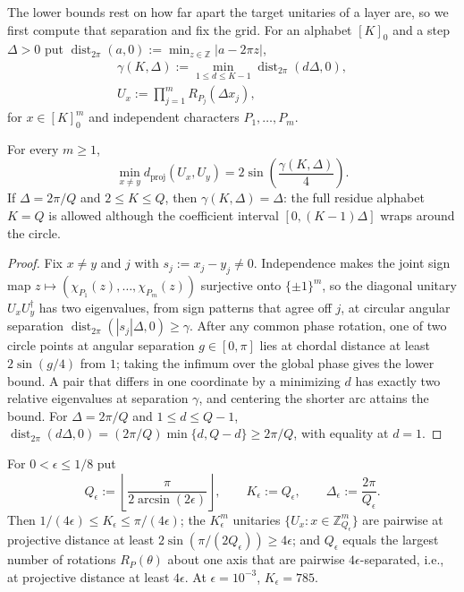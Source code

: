 The lower bounds rest on how far apart the target unitaries of a layer
are, so we first compute that separation and fix the grid.  For an
alphabet $[K]_0$ and a step $\Delta>0$ put
$\operatorname{dist}_{2\pi}(a,0):=\min_{z\in\mathbb Z}|a-2\pi z|$,
\begin{gather*}
 \gamma(K,\Delta):=\min_{1\leq d\leq K-1}
       \operatorname{dist}_{2\pi}(d\Delta,0),\\
 U_x:=\prod_{j=1}^mR_{P_j}(\Delta x_j),
\end{gather*}
for $x\in[K]_0^m$ and independent characters $P_1,\ldots,P_m$.

\begin{theorem}
\label{thm:w1-exact-separation}
For every $m\geq1$,
\begin{equation}
 \min_{x\neq y}d_{\mathrm{proj}}(U_x,U_y)
 =2\sin\!\left(\frac{\gamma(K,\Delta)}4\right).
 \label{eq:w1-exact-separation}
\end{equation}
If $\Delta=2\pi/Q$ and $2\leq K\leq Q$, then $\gamma(K,\Delta)=\Delta$:
the full residue alphabet $K=Q$ is allowed although the coefficient
interval $[0,(K-1)\Delta]$ wraps around the circle.
\end{theorem}

\begin{proof}
Fix $x\neq y$ and $j$ with $s_j:=x_j-y_j\neq0$.  Independence makes the
joint sign map $z\mapsto(\chi_{P_1}(z),\ldots,\chi_{P_m}(z))$ surjective
onto $\{\pm1\}^m$, so the diagonal unitary $U_xU_y^\dagger$ has two
eigenvalues, from sign patterns that agree off $j$, at circular angular
separation $\operatorname{dist}_{2\pi}(|s_j|\Delta,0)\geq\gamma$.  After
any common phase rotation, one of two circle points at angular separation
$g\in[0,\pi]$ lies at chordal distance at least $2\sin(g/4)$ from $1$;
taking the infimum over the global phase gives the lower bound.  A pair
that differs in one coordinate by a minimizing $d$ has exactly two
relative eigenvalues at separation $\gamma$, and centering the shorter arc
attains the bound.  For $\Delta=2\pi/Q$ and $1\leq d\leq Q-1$,
$\operatorname{dist}_{2\pi}(d\Delta,0)=(2\pi/Q)\min\{d,Q-d\}\geq2\pi/Q$,
with equality at $d=1$.
\end{proof}

\begin{corollary}
\label{cor:w1-epsilon-cyclic}
\label{lem:grid-calibration}
For $0<\epsilon\leq1/8$ put
\begin{equation}
 Q_\epsilon:=\left\lfloor
 \frac{\pi}{2\arcsin(2\epsilon)}\right\rfloor,
 \qquad K_\epsilon:=Q_\epsilon,
 \qquad \Delta_\epsilon:=\frac{2\pi}{Q_\epsilon}.
 \label{eq:w1-epsilon-grid}
\end{equation}
Then $1/(4\epsilon)\leq K_\epsilon\leq\pi/(4\epsilon)$; the
$K_\epsilon^m$ unitaries $\{U_x:x\in\mathbb Z_{Q_\epsilon}^m\}$ are
pairwise at projective distance at least
$2\sin(\pi/(2Q_\epsilon))\geq4\epsilon$; and $Q_\epsilon$ equals the
largest number of rotations $R_P(\theta)$ about one axis that are
pairwise $4\epsilon$-separated, i.e., at projective distance at least
$4\epsilon$.  At $\epsilon=10^{-3}$,
$K_\epsilon=785$.
\end{corollary}

